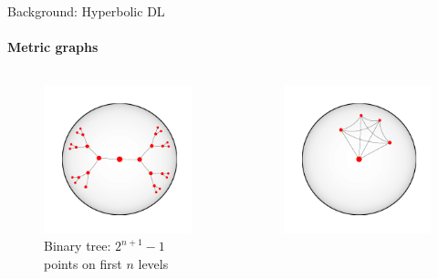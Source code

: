 \begin{frame}{Background: Hyperbolic DL}
    \framesubtitle{Metric graphs}

    \begin{columns}
        \begin{column}{.45\linewidth}
            \begin{figure}\centering
                \includegraphics[width=.95\linewidth]{art/h-binary-tree.pdf}
                \caption{Binary tree: \( 2^{n+1}-1 \)
                points on first \( n \) levels}
            \end{figure}
        \end{column}
        \begin{column}{.45\linewidth}
            \begin{figure}\centering
                \includegraphics[width=.95\linewidth]{art/h-clique.pdf}

\end{figure}
\end{column}
\end{columns}
\end{frame}
